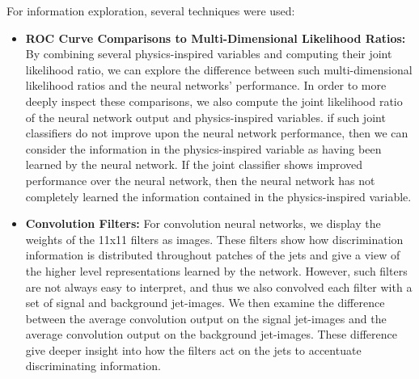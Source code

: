 %

For information exploration, several techniques were used:
\begin{itemize}

\item \textbf{ROC Curve Comparisons to Multi-Dimensional Likelihood Ratios:}  By combining several physics-inspired variables and computing their joint likelihood ratio, we can explore the difference between such multi-dimensional likelihood ratios and the neural networks' performance.  In order to more deeply inspect these comparisons, we also compute the joint likelihood ratio of the neural network output and physics-inspired variables.  if such joint classifiers do not improve upon the neural network performance, then we can consider the information in the physics-inspired variable as having been learned by the neural network.  If the joint classifier shows improved performance over the neural network, then the neural network has not completely learned the information contained in the physics-inspired variable.

\item \textbf{Convolution Filters:}  For convolution neural networks, we display the weights of the 11x11 filters as images.  These filters show how discrimination information is distributed throughout patches of the jets and give a view of the higher level representations learned by the network.  However, such filters are not always easy to interpret, and thus we also convolved each filter with a set of signal and background jet-images.  We then examine the difference between the average convolution output on the signal jet-images and the average convolution output on the background jet-images.  These difference give deeper insight into how the filters act on the jets to accentuate discriminating information.


\end{itemize}
